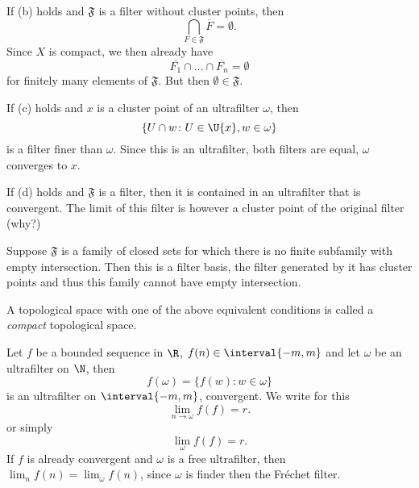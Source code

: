 \documentclass[%
	,english 
	,headings	= small 
	,leqno
	,parskip		= half+
	,DIV			= 14
	,BCOR 			= 10mm	
		]{scrartcl}
\begin{document}
\begin{multicols}{2}
If (b) holds and $ \mathfrak{ F } $ is a filter without cluster points, then
%
\[
    \bigcap_{ F \in \mathfrak{ F } } \overline{ F } = \emptyset  . 
\]
%
Since $ X $ is compact, we then already have 
%
\[
    \overline{F_{ 1 }} \cap \ldots \cap \overline{F_{ n }} = \emptyset 
\]
%
for finitely many elements of $ \mathfrak{ F } $.
But then $ \emptyset \in \mathfrak{ F } $.

If (c) holds and $ x $ is a cluster point of an ultrafilter $ \omega $, then
%
\[
    \{ U \cap w \colon U \in \U{x} ,  w \in \omega \}
\]
%
is a filter finer than $ \omega $.
Since this is an ultrafilter, both filters are equal, \ie $ \omega $ converges to $ x $.

If (d) holds and $ \mathfrak{ F } $ is a filter, then it is contained in an ultrafilter that is convergent.
The limit of this filter is however a cluster point of the original filter (why?)

Suppose $ \mathfrak{ F } $ is a family of closed sets for which there is no finite subfamily with empty intersection.
Then this is a filter basis, \ie the filter generated by it has cluster points and thus this family cannot have empty intersection.

\begin{definition}
A topological space with one of the above equivalent conditions is called a \emph{compact} topological space.
\end{definition}
%
\begin{example}
Let $ f $ be a bounded sequence in $ \R $, \ie $ f(n) \in \interval{-m,m} $ and let $ \omega $ be an ultrafilter on $ \N $, then 
%
\[
    f( \omega ) = \{ f(w) \colon w \in \omega \}
\]
%
is an ultrafilter on $ \interval{-m,m} $, \ie convergent.
We write for this
%
\[
    \lim_{ n \to \omega } f(f) = r  . 
\]
%
or simply
%
\[
    \lim_{ \omega } f(f) = r  . 
\]
%
If $ f $ is already convergent and $ \omega $ is a free ultrafilter, then $ \lim_{n} f(n) = \lim_{ \omega } f(n) $, since $ \omega $ is finder then the Fréchet filter. 

\end{example}
%
%
%

\end{multicols}
\end{document}
